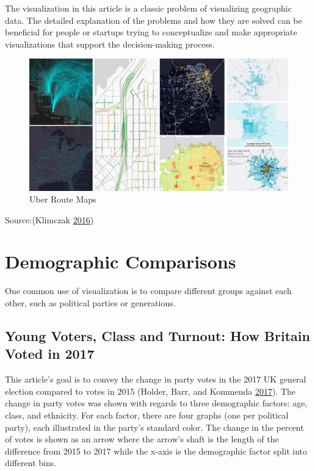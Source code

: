 \documentclass[]{book}
\begin{document}
The visualization in this article is a classic problem of visualizing geographic data. The detailed explanation of the problems and how they are solved can be beneficial for people or startups trying to conceptualize and make appropriate visualizations that support the decision-making process.

\begin{figure}
\centering
\includegraphics{images/uber_map.png}
\caption{Uber Route Maps}
\end{figure}

Source:(Klimczak \protect\hyperlink{ref-uber_maps}{2016})

\hypertarget{demographic-comparisons}{%
\section{Demographic Comparisons}\label{demographic-comparisons}}

One common use of visualization is to compare different groups against each other, such as political parties or generations.

\hypertarget{young-voters-class-and-turnout-how-britain-voted-in-2017}{%
\subsection{Young Voters, Class and Turnout: How Britain Voted in 2017}\label{young-voters-class-and-turnout-how-britain-voted-in-2017}}

This article's goal is to convey the change in party votes in the 2017 UK general election compared to votes in 2015 (Holder, Barr, and Kommenda \protect\hyperlink{ref-UKvotes2017}{2017}). The change in party votes was shown with regards to three demographic factors: age, class, and ethnicity. For each factor, there are four graphs (one per political party), each illustrated in the party's standard color. The change in the percent of votes is shown as an arrow where the arrow's shaft is the length of the difference from 2015 to 2017 while the x-axis is the demographic factor split into different bins.
\end{document}
